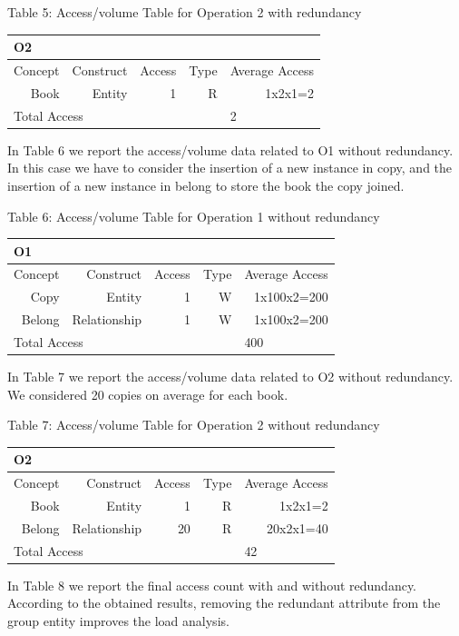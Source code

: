 Table 5: Access/volume Table for Operation 2 with redundancy 
\begin{center}
\begin{tabular}{|r|r|r|r|r|}
\hline
\multicolumn{5}{|l|}{O2}\\\hline
    Concept & Construct & Access & Type & Average 
    Access\\\hline
      {Book } &  {Entity} &  {1}  & {R}  & {1x2x1=2 }\\\hline

    \multicolumn{4}{|l}{Total Access}&\multicolumn{1}{|l|}{2}\\\hline
\end{tabular}
\end{center}
In Table  6 we report the access/volume data related to O1 without redundancy. In this case we have to consider the insertion of a new instance in copy, and the insertion of a new instance in belong  to store the book the copy joined. 

Table 6: Access/volume Table for Operation 1 without redundancy 

\begin{center}
\begin{tabular}{|r|r|r|r|r|}
\hline
\multicolumn{5}{|l|}{O1}\\\hline
    Concept & Construct & Access & Type & Average Access\\\hline
{Copy} &  {Entity} &  {1}  & {W}  & {1x100x2=200 }\\\hline
      {Belong } &  {Relationship} &  {1}  & {W}  & {1x100x2=200 }\\\hline

    \multicolumn{4}{|l}{Total Access}&\multicolumn{1}{|l|}{400}\\\hline
\end{tabular}
\end{center}
In Table  7 we report the access/volume data related to O2 without redundancy. We considered 20 copies on average for each book. 

Table 7: Access/volume Table for Operation 2 without redundancy 

\begin{center}
\begin{tabular}{|r|r|r|r|r|}
\hline
\multicolumn{5}{|l|}{O2}\\\hline

    Concept & Construct & Access & Type & Average Access\\\hline
         {Book } &  {Entity} &  {1}  & {R}  & {1x2x1=2  }\\\hline
      {Belong } &  {Relationship} &  {20}  & {R}  & {20x2x1=40 }\\\hline

   \multicolumn{4}{|l|}{Total Access}&\multicolumn{1}{|l|}{42}\\\hline
\end{tabular}
\end{center}
In Table  8 we report the final access count with and without redundancy. According to the obtained results, removing the redundant attribute from the group entity improves the load analysis. 

